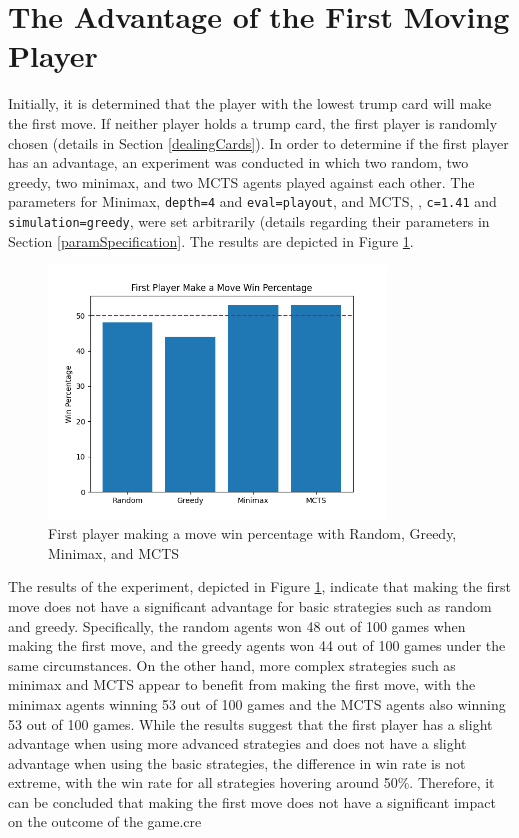 \section{The Advantage of the First Moving Player}

Initially, it is determined that the player with the lowest trump card will make the first move. If neither player holds a trump card, the first player is randomly chosen (details in Section \ref{dealingCards}). In order to determine if the first player has an advantage, an experiment was conducted in which two random, two greedy, two minimax, and two MCTS agents played against each other. The parameters for Minimax, \texttt{depth=4} and \texttt{eval=playout}, and MCTS, , \texttt{c=1.41} and \texttt{simulation=greedy}, were set arbitrarily (details regarding their parameters in Section \ref{paramSpecification}. The results are depicted in Figure \ref{firstmoveadvantage}.

\begin{figure}[h]
  \centering
  \captionsetup{justification=centering}
  \includegraphics[width=0.8\textwidth]{../img/advantage.png}
  \caption{First player making a move win percentage with Random, Greedy, Minimax, and MCTS}
  \label{firstmoveadvantage}
\end{figure}

The results of the experiment, depicted in Figure \ref{firstmoveadvantage}, indicate that making the first move does not have a significant advantage for basic strategies such as random and greedy. Specifically, the random agents won 48 out of 100 games when making the first move, and the greedy agents won 44 out of 100 games under the same circumstances. On the other hand, more complex strategies such as minimax and MCTS appear to benefit from making the first move, with the minimax agents winning 53 out of 100 games and the MCTS agents also winning 53 out of 100 games. While the results suggest that the first player has a slight advantage when using more advanced strategies and does not have a slight advantage when using the basic strategies, the difference in win rate is not extreme, with the win rate for all strategies hovering around 50\%. Therefore, it can be concluded that making the first move does not have a significant impact on the outcome of the game.cre

